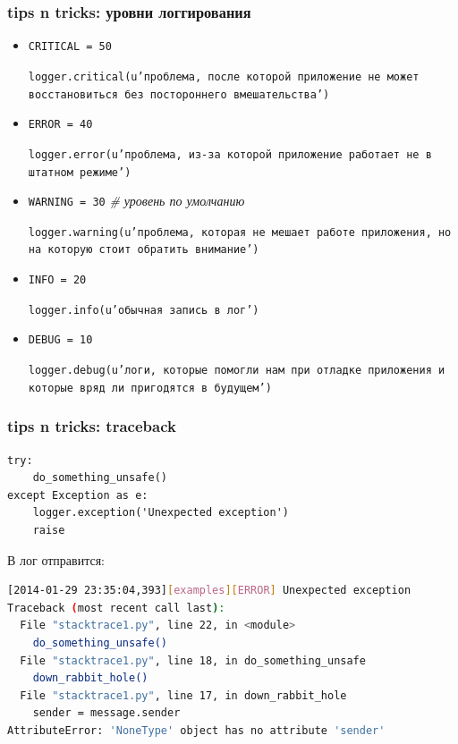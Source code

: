 \documentclass[aspectratio=169]{beamer}
\begin{document}
\begin{frame}
  \frametitle{tips n tricks: уровни логгирования}
  \pause
  \begin{itemize}
    \item {\tt CRITICAL = 50 } \par
      {\tt logger.critical(u'проблема, после которой приложение не может восстановиться без постороннего вмешательства') }
      \pause
    \item {\tt ERROR = 40} \par
      {\tt logger.error(u'проблема, из-за которой приложение работает не в штатном режиме') } \par
      \pause
    \item {\tt WARNING = 30} {\it \# уровень по умолчанию } \par
      {\tt logger.warning(u'проблема, которая не мешает работе приложения, но на которую стоит  обратить внимание') } \par
      \pause
    \item {\tt INFO = 20} \par
      {\tt logger.info(u'обычная запись в лог') }
      \pause
    \item {\tt DEBUG = 10} \par
      {\tt logger.debug(u'логи, которые помогли нам при отладке приложения и которые вряд ли пригодятся в будущем') }
  \end{itemize}
\end{frame}


\begin{frame}[fragile]
  \frametitle{tips n tricks: traceback}
  \begin{lstlisting}
try:
    do_something_unsafe()
except Exception as e:
    logger.exception('Unexpected exception')
    raise
  \end{lstlisting}

  \pause
  В лог отправится:

  \begin{lstlisting}[language=sh]
[2014-01-29 23:35:04,393][examples][ERROR] Unexpected exception
Traceback (most recent call last):
  File "stacktrace1.py", line 22, in <module>
    do_something_unsafe()
  File "stacktrace1.py", line 18, in do_something_unsafe
    down_rabbit_hole()
  File "stacktrace1.py", line 17, in down_rabbit_hole
    sender = message.sender
AttributeError: 'NoneType' object has no attribute 'sender'
  \end{lstlisting}

\end{frame}
\end{document}
